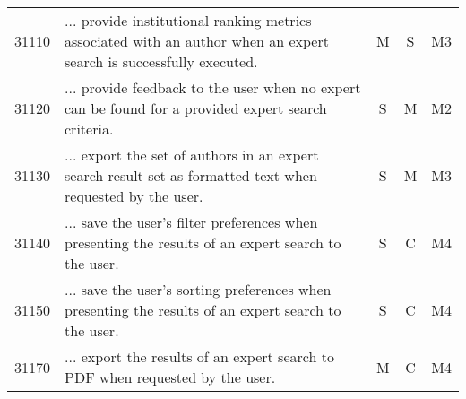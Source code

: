 \begin{table}[ht!]
\begin{tabular}{l p{\requirementwidth} c c c}
        31110 & ... provide institutional ranking metrics associated with an author when an expert search is successfully executed. & M & S & M3 \\ 
        31120 & ... provide feedback to the user when no expert can be found for a provided expert search criteria. & S & M & M2 \\ 
        31130 & ... export the set of authors in an expert search result set as formatted text when requested by the user. & S & M & M3 \\ 
        31140 & ... save the user’s filter preferences when presenting the results of an expert search to the user. & S & C & M4 \\ 
        31150 & ... save the user’s sorting preferences when presenting the results of an expert search to the user. & S & C & M4 \\ 
        31170 & ... export the results of an expert search to PDF when requested by the user. & M & C & M4 \\
    \end{tabular}
\end{table}


